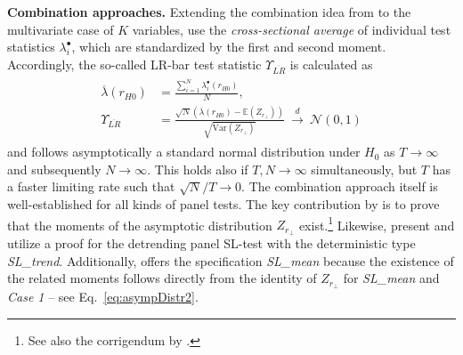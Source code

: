 \textbf{Combination approaches.} Extending the combination idea from \citet{ImPesaranShin2003} to the multivariate case of $ K $ variables, \cite{LarssonEtAl2001} use the \textit{cross-sectional average} of individual test statistics $ \lambda^\bullet_i $, which are standardized by the first and second moment. Accordingly, the so-called LR-bar test statistic $ \Upsilon_{\overline{LR}} $ is calculated as
\begin{align} \label{eq:LRbar}
\begin{split}
	\overline{\lambda} (r_{H0}) & =\frac{ \sum_{i=1}^{N} \lambda^\bullet_i \left( r_{H0} \right) }{N}, \\
	\Upsilon_{\overline{LR}} & = \frac{\sqrt{N} \left( \overline{\lambda} (r_{H0}) - \mathbb{E}\left( Z_{r_\perp} \right) \right) }{ \sqrt{ \text{Var}\left( Z_{r_\perp} \right) } } \ \overset{d}{\longrightarrow} \ \mathcal{N}(0,1)
\end{split}
\end{align}
and follows asymptotically a standard normal distribution under $ H_0 $ as $ T \to \infty $ and subsequently $ N \to \infty $. This holds also if $ T,N \to \infty $ simultaneously, but $ T $ has a faster limiting rate such that $ \sqrt{N}/T \to 0 $. The combination approach itself is well-established for all kinds of panel tests. The key contribution by \cite{LarssonEtAl2001} is to prove that the moments of the asymptotic distribution $ Z_{r_\perp} $ exist.\footnote{See also the corrigendum by \citet{OersalDroge2011}.} Likewise, \citet{OersalDroge2014} present and utilize a proof for the detrending panel SL-test with the deterministic type \textit{SL\_trend}. Additionally,  offers the specification \textit{SL\_mean} because the existence of the related moments follows directly from the identity of $ Z_{r_\perp} $ for \textit{SL\_mean} and \textit{Case 1} -- see Eq.~\eqref{eq:asympDistr2}. 

